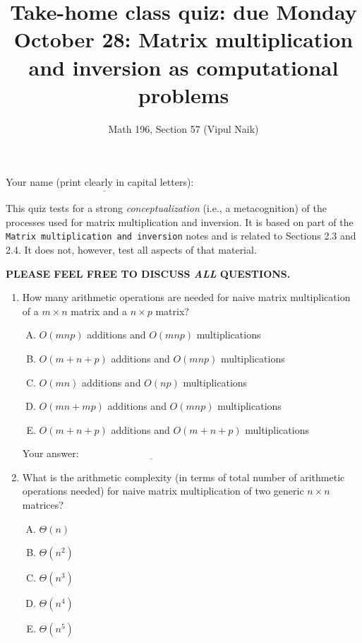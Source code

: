 \documentclass[10pt]{amsart}
\title{Take-home class quiz: due Monday October 28: Matrix multiplication and inversion as computational problems}
\author{Math 196, Section 57 (Vipul Naik)}
\begin{document}
\maketitle

Your name (print clearly in capital letters): $\underline{\qquad\qquad\qquad\qquad\qquad\qquad\qquad\qquad\qquad\qquad}$

This quiz tests for a strong {\em conceptualization} (i.e., a
metacognition) of the processes used for matrix multiplication and
inversion. It is based on part of the {\tt Matrix multiplication and
  inversion} notes and is related to Sections 2.3 and 2.4. It does
not, however, test all aspects of that material.

{\bf PLEASE FEEL FREE TO DISCUSS {\em ALL} QUESTIONS.}

\begin{enumerate}
\item How many arithmetic operations are needed for naive matrix
  multiplication of a $m \times n$ matrix and a $n \times p$ matrix?

  \begin{enumerate}[(A)]
  \item $O(mnp)$ additions and $O(mnp)$ multiplications
  \item $O(m + n + p)$ additions and $O(mnp)$ multiplications
  \item $O(mn)$ additions and $O(np)$ multiplications
  \item $O(mn + mp)$ additions and $O(mnp)$ multiplications
  \item $O(m + n + p)$ additions and $O(m + n + p)$ multiplications
  \end{enumerate}

  \vspace{0.1in}
  Your answer: $\underline{\qquad\qquad\qquad\qquad\qquad\qquad\qquad}$
  \vspace{0.1in}

\item What is the arithmetic complexity (in terms of total number of
  arithmetic operations needed) for naive matrix multiplication of two
  generic $n \times n$ matrices?

  \begin{enumerate}[(A)]
  \item $\Theta(n)$
  \item $\Theta(n^2)$
  \item $\Theta(n^3)$
  \item $\Theta(n^4)$
  \item $\Theta(n^5)$
  \end{enumerate}


\end{enumerate}
\end{document}
